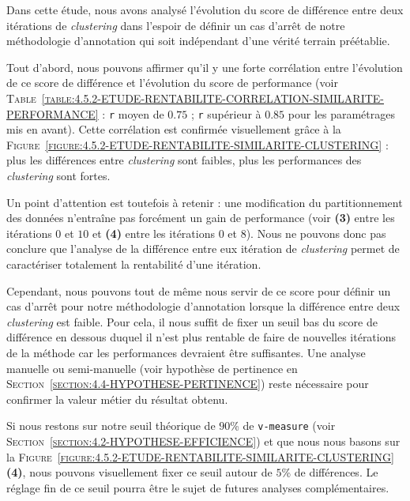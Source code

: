 			Dans cette étude, nous avons analysé l'évolution du score de différence entre deux itérations de \textit{clustering} dans l'espoir de définir un cas d'arrêt de notre méthodologie d'annotation qui soit indépendant d'une vérité terrain préétablie.
			
			Tout d'abord, nous pouvons affirmer qu'il y une forte corrélation entre l'évolution de ce score de différence et l'évolution du score de performance (voir \textsc{Table~\ref{table:4.5.2-ETUDE-RENTABILITE-CORRELATION-SIMILARITE-PERFORMANCE}} : \texttt{r} moyen de $0.75$ ; \texttt{r} supérieur à $0.85$ pour les paramétrages mis en avant).
			Cette corrélation est confirmée visuellement grâce à la \textsc{Figure~\ref{figure:4.5.2-ETUDE-RENTABILITE-SIMILARITE-CLUSTERING}} : plus les différences entre \textit{clustering} sont faibles, plus les performances des \textit{clustering} sont fortes.
			
			Un point d'attention est toutefois à retenir : une modification du partitionnement des données n'entraîne pas forcément un gain de performance (voir \textbf{(3)} entre les itérations $0$ et $10$ et \textbf{(4)} entre les itérations $0$ et $8$).
			Nous ne pouvons donc pas conclure que l'analyse de la différence entre eux itération de \textit{clustering} permet de caractériser totalement la rentabilité d'une itération.
			
			Cependant, nous pouvons tout de même nous servir de ce score pour définir un cas d'arrêt pour notre méthodologie d'annotation lorsque la différence entre deux \textit{clustering} est faible.
			Pour cela, il nous suffit de fixer un seuil bas du score de différence en dessous duquel il n'est plus rentable de faire de nouvelles itérations de la méthode car les performances devraient être suffisantes.
			Une analyse manuelle ou semi-manuelle (voir hypothèse de pertinence en \textsc{Section~\ref{section:4.4-HYPOTHESE-PERTINENCE}}) reste nécessaire pour confirmer la valeur métier du résultat obtenu.
			
			\begin{leftBarIdea}
				Si nous restons sur notre seuil théorique de $90$\% de \texttt{v-measure} (voir \textsc{Section~\ref{section:4.2-HYPOTHESE-EFFICIENCE}}) et que nous nous basons sur la \textsc{Figure~\ref{figure:4.5.2-ETUDE-RENTABILITE-SIMILARITE-CLUSTERING}} \textbf{(4)}, nous pouvons visuellement fixer ce seuil autour de $5$\% de différences.
				Le réglage fin de ce seuil pourra être le sujet de futures analyses complémentaires.
			\end{leftBarIdea}
			
